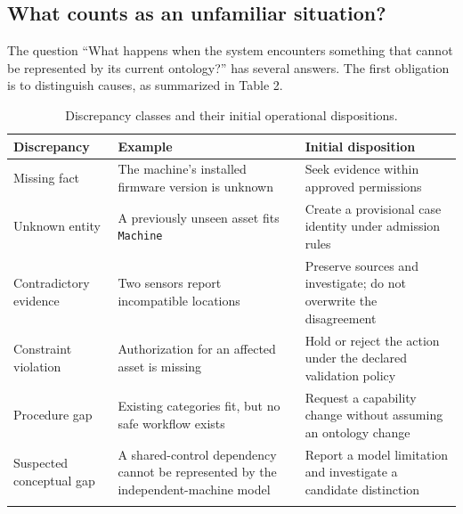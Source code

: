 \documentclass[preprint,12pt,authoryear]{elsarticle}
\begin{document}
\subsection{What counts as an unfamiliar
situation?}\label{what-counts-as-an-unfamiliar-situation}

The question ``What happens when the system encounters something that
cannot be represented by its current ontology?'' has several answers.
The first obligation is to distinguish causes, as summarized in Table 2.


\begin{table}[!htbp]\centering\footnotesize
\caption{Discrepancy classes and their initial operational
dispositions.}
\medskip
\begin{tabular}{@{}
  >{\raggedright\arraybackslash}p{}
  >{\raggedright\arraybackslash}p{}
  >{\raggedright\arraybackslash}p{}@{}}
\toprule\noalign{}
\begin{minipage}[b]{\linewidth}\raggedright
Discrepancy
\end{minipage} & \begin{minipage}[b]{\linewidth}\raggedright
Example
\end{minipage} & \begin{minipage}[b]{\linewidth}\raggedright
Initial disposition
\end{minipage} \\
\midrule\noalign{}

Missing fact & The machine's installed firmware version is unknown &
Seek evidence within approved permissions \\
\addlinespace[4pt]
Unknown entity & A previously unseen asset fits \texttt{Machine} &
Create a provisional case identity under admission rules \\
\addlinespace[4pt]
Contradictory evidence & Two sensors report incompatible locations &
Preserve sources and investigate; do not overwrite the disagreement \\
\addlinespace[4pt]
Constraint violation & Authorization for an affected asset is missing &
Hold or reject the action under the declared validation policy \\
\addlinespace[4pt]
Procedure gap & Existing categories fit, but no safe workflow exists &
Request a capability change without assuming an ontology change \\
\addlinespace[4pt]
Suspected conceptual gap & A shared-control dependency cannot be
represented by the independent-machine model & Report a model limitation
and investigate a candidate distinction \\
\addlinespace[4pt]
\bottomrule
\end{tabular}
\end{table}
\end{document}
